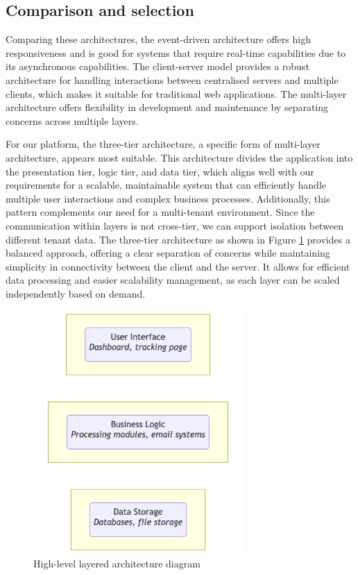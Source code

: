 

\subsection{Comparison and selection}
Comparing these architectures, the event-driven architecture offers high responsiveness and is good for systems that require real-time capabilities due to its asynchronous capabilities.
The client-server model provides a robust architecture for handling interactions between centralised servers and multiple clients, which makes it suitable for traditional web applications. 
The multi-layer architecture offers flexibility in development and maintenance by separating concerns across multiple layers.

For our platform, the three-tier architecture, a specific form of multi-layer architecture, appears most suitable. This architecture divides the application into the presentation tier, logic tier, and data tier, which aligns well with our requirements for a scalable, maintainable system that can efficiently handle multiple user interactions and complex business processes. 
Additionally, this pattern complements our need for a multi-tenant environment.
Since the communication within layers is not cross-tier, we can support isolation between different tenant data.
The three-tier architecture as shown in Figure \ref{img03:layered_architecture_diagram} provides a balanced approach, offering a clear separation of concerns while maintaining simplicity in connectivity between the client and the server. 
It allows for efficient data processing and easier scalability management, as each layer can be scaled independently based on demand.

\begin{figure}[H]\centering
\includegraphics[width=80mm]{img/chap03/fig_layered_architecture_mermaid.png}
\caption{High-level layered architecture diagram}
\label{img03:layered_architecture_diagram}
\end{figure}


